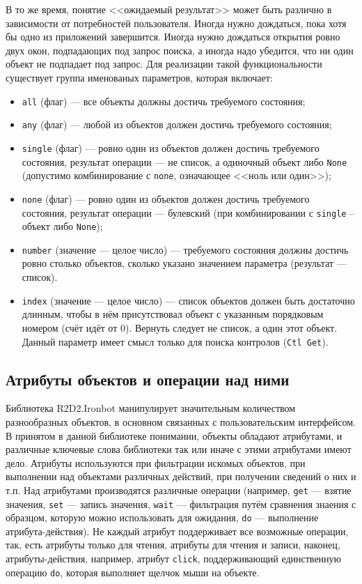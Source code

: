 \documentclass[11pt]{book} %
\begin{document}
В то же время, понятие <<ожидаемый результат>> может быть различно в зависимости от потребностей пользователя. Иногда нужно дождаться, пока хотя бы одно из приложений завершится. Иногда нужно дождаться открытия ровно двух окон, подпадающих под запрос поиска, а иногда надо убедится, что ни один объект не подпадает под запрос. Для реализации такой функциональности существует группа именованых параметров, которая включает:
\begin{itemize}
\item \verb|all| (флаг) --- все объекты должны достичь требуемого состояния;
\item \verb|any| (флаг) --- любой из объектов должен достичь требуемого состояния;
\item \verb|single| (флаг) --- ровно один из объектов должен достичь требуемого состояния, результат операции --- не список, а одиночный объект либо \verb|None| (допустимо комбинирование с \verb|none|, означающее <<ноль или один>>);
\item \verb|none| (флаг) --- ровно один из объектов должен достичь требуемого состояния, результат операции --- булевский (при комбинировании с \verb|single| -- объект либо \verb|None|);
\item \verb|number| (значение --- целое число) --- требуемого состояния должны достичь ровно столько объектов, сколько указано значением параметра (результат --- список).
\item \verb|index| (значение --- целое число) --- список объектов должен быть достаточно длинным, чтобы в нём присутствовал объект с указанным порядковым номером (счёт идёт от 0). Вернуть следует не список, а один этот объект. Данный параметр имеет смысл только для поиска контролов (\verb|Ctl Get|).
\end{itemize}

\subsection{Атрибуты объектов и операции над ними}

Библиотека R2D2.Ironbot манипулирует значительным количеством разнообразных объектов, в основном связанных с пользовательским интерфейсом. В принятом в данной библиотеке понимании, объекты обладают атрибутами, и различные ключевые слова библиотеки так или иначе с этими атрибутами имеют дело. Атрибуты используются при фильтрации искомых объектов, при выполнении над объектами различных действий, при получении сведений о них и т.п. Над атрибутами производятся различные операции (например, \verb|get| --- взятие значения, \verb|set| --- запись значения, \verb|wait| --- фильтрация путём сравнения знаения с образцом, которую можно использовать для ожидания, \verb|do| --- выполнение атрибута-действия). Не каждый атрибут поддерживает все возможные операции, так, есть атрибуты только для чтения, атрибуты для чтения и записи, наконец, атрибуты-действия, например, атрибут \verb|click|, поддерживающий единственную операцию \verb|do|, которая выполняет щелчок мыши на объекте.
\end{document}
